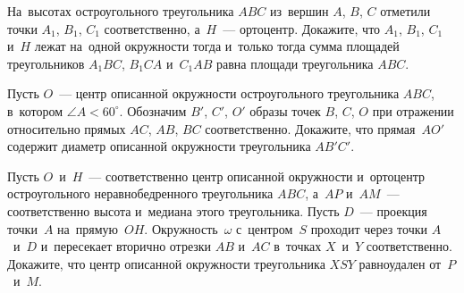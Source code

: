 \begin{problems}
\item
На~высотах остроугольного треугольника $ABC$ из~вершин $A$, $B$, $C$ отметили
точки $A_1$, $B_1$, $C_1$ соответственно, а~$H$~--- ортоцентр.
Докажите, что $A_1$, $B_1$, $C_1$ и~$H$ лежат на~одной окружности тогда
и~только тогда сумма площадей треугольников $A_{1}BC$, $B_{1}CA$ и~$C_{1}AB$
равна площади треугольника $ABC$.

\item
Пусть $O$~--- центр описанной окружности остроугольного треугольника $ABC$,
в~котором $\angle A < 60^{\circ}$.
Обозначим $B'$, $C'$, $O'$ образы точек $B$, $C$, $O$ при отражении
относительно прямых $AC$, $AB$, $BC$ соответственно.
Докажите, что прямая~$AO'$ содержит диаметр описанной окружности треугольника
$AB'C'$.

\item
Пусть $O$~и~$H$~--- соответственно центр описанной окружности и~ортоцентр
остроугольного неравнобедренного треугольника $ABC$, а~$AP$ и~$AM$~---
соответственно высота и~медиана этого треугольника.
Пусть $D$~--- проекция точки~$A$ на~прямую~$OH$.
Окружность~$\omega$ с~центром~$S$ проходит через точки $A$~и~$D$ и~пересекает
вторично отрезки $AB$ и~$AC$ в~точках $X$~и~$Y$ соответственно.
Докажите, что центр описанной окружности треугольника $XSY$ равноудален
от~$P$~и~$M$.

\end{problems}

